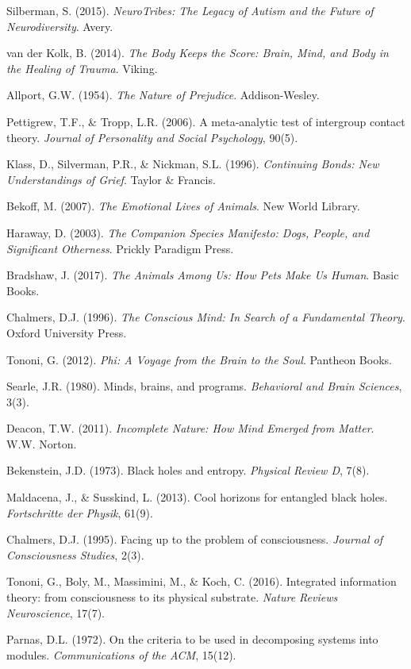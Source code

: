  Silberman, S. (2015). \emph{NeuroTribes: The Legacy of Autism and the Future of Neurodiversity}. Avery.

 van der Kolk, B. (2014). \emph{The Body Keeps the Score: Brain, Mind, and Body in the Healing of Trauma}. Viking.

 Allport, G.W. (1954). \emph{The Nature of Prejudice}. Addison-Wesley.

 Pettigrew, T.F., \& Tropp, L.R. (2006). A meta-analytic test of intergroup contact theory. \emph{Journal of Personality and Social Psychology}, 90(5).

 Klass, D., Silverman, P.R., \& Nickman, S.L. (1996). \emph{Continuing Bonds: New Understandings of Grief}. Taylor \& Francis.

 Bekoff, M. (2007). \emph{The Emotional Lives of Animals}. New World Library.

 Haraway, D. (2003). \emph{The Companion Species Manifesto: Dogs, People, and Significant Otherness}. Prickly Paradigm Press.

 Bradshaw, J. (2017). \emph{The Animals Among Us: How Pets Make Us Human}. Basic Books.

 Chalmers, D.J. (1996). \emph{The Conscious Mind: In Search of a Fundamental Theory}. Oxford University Press.

 Tononi, G. (2012). \emph{Phi: A Voyage from the Brain to the Soul}. Pantheon Books.

 Searle, J.R. (1980). Minds, brains, and programs. \emph{Behavioral and Brain Sciences}, 3(3).

 Deacon, T.W. (2011). \emph{Incomplete Nature: How Mind Emerged from Matter}. W.W. Norton.

 Bekenstein, J.D. (1973). Black holes and entropy. \emph{Physical Review D}, 7(8).

 Maldacena, J., \& Susskind, L. (2013). Cool horizons for entangled black holes. \emph{Fortschritte der Physik}, 61(9).

 Chalmers, D.J. (1995). Facing up to the problem of consciousness. \emph{Journal of Consciousness Studies}, 2(3).

 Tononi, G., Boly, M., Massimini, M., \& Koch, C. (2016). Integrated information theory: from consciousness to its physical substrate. \emph{Nature Reviews Neuroscience}, 17(7).

 Parnas, D.L. (1972). On the criteria to be used in decomposing systems into modules. \emph{Communications of the ACM}, 15(12).

